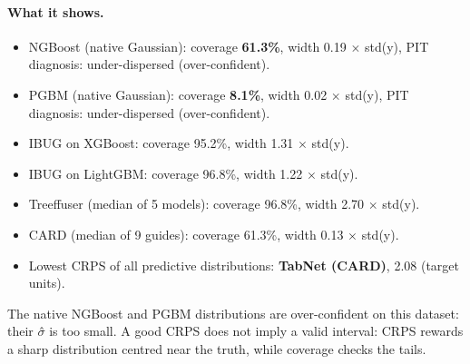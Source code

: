 \documentclass[11pt]{article}
\begin{document}
\paragraph{What it shows.}
\begin{itemize}
\item NGBoost (native Gaussian): coverage \textbf{61.3\%}, width 0.19 $\times$ std(y), PIT diagnosis: under-dispersed (over-confident).
\item PGBM (native Gaussian): coverage \textbf{8.1\%}, width 0.02 $\times$ std(y), PIT diagnosis: under-dispersed (over-confident).
\item IBUG on XGBoost: coverage 95.2\%, width 1.31 $\times$ std(y).
\item IBUG on LightGBM: coverage 96.8\%, width 1.22 $\times$ std(y).
\item Treeffuser (median of 5 models): coverage 96.8\%, width 2.70 $\times$ std(y).
\item CARD (median of 9 guides): coverage 61.3\%, width 0.13 $\times$ std(y).
\item Lowest CRPS of all predictive distributions: \textbf{TabNet (CARD)}, 2.08 (target units).
\end{itemize}
\begin{insight}[Takeaway RQ3]
The native NGBoost and PGBM distributions are over-confident on this dataset: their $\sigma$̂ is too small. A good CRPS does not imply a valid interval: CRPS rewards a sharp distribution centred near the truth, while coverage checks the tails.
\end{insight}
\end{document}
